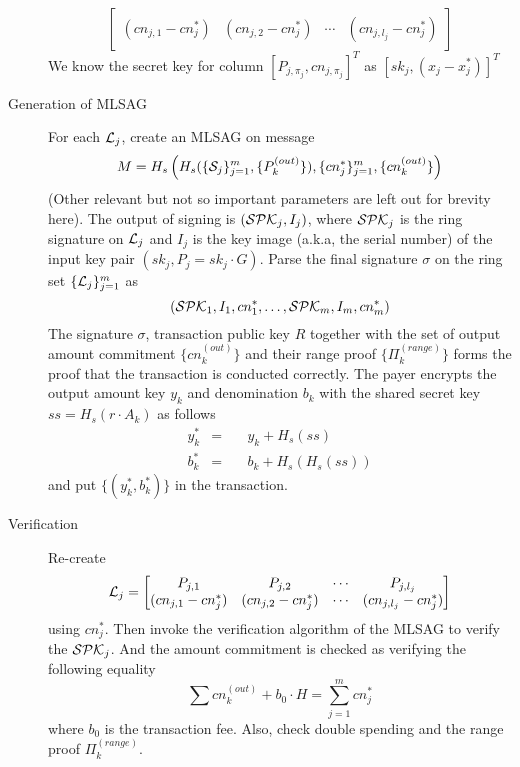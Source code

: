 \begin{description}
\[\begin{bmatrix}
				(cn_{j,1}-cn_j^*) &(cn_{j,2}-cn_j^*) &\cdots &(cn_{j,l_j}-cn_j^*)
			\end{bmatrix}
		\]
		We know the secret key for column \([P_{j,\pi_j}, cn_{j,\pi_j}]^T\) as \([sk_j,(x_j-x_j^*)]^T\)
		\item[Generation of MLSAG] For each \(\mathcal{L}_j\), create an MLSAG on message 
		\[
			M=H_s\left(H_s(\{\mathcal{S}_j\}_{j=1}^m, \{P_k^{(out)}\}),\{cn_j^*\}_{j=1}^m,\{cn_k^{(out)}\}\right)
		\] 
		(Other relevant but not so important parameters are left out for brevity here). The output of signing is \((\mathcal{SPK}_j, I_j)\), where \(\mathcal{SPK}_j\) is the ring signature on \(\mathcal{L}_j\) and \(I_j\) is the key image (a.k.a, the serial number) of the input key pair \( (sk_j,P_j=sk_j\cdot G)\). Parse the final signature \(\sigma\) on the ring set \(\{\mathcal{L}_j\}_{j=1}^m\) as 
		\[
			(\mathcal{SPK}_1,I_1,cn_1^*,\dots,\mathcal{SPK}_m,I_m,cn_m^*)
		\]
		The signature \(\sigma\), transaction public key \(R\) together with the set of output amount commitment \(\{cn_k^{(out)}\}\) and their range proof \(\{\Pi_k^{(range)}\}\) forms the proof that the transaction is conducted correctly. The payer encrypts the output amount key \(y_k\) and denomination \(b_k\) with the shared secret key \(ss=H_s(r\cdot A_k)\) as follows
		\[
			\begin{aligned}
				y_k^* &= &\quad y_k+H_s(ss) \\
				b_k^* &= &\quad b_k+H_s(H_s(ss))
			\end{aligned}
		\]
		and put \(\{(y_k^*,b_k^*)\}\) in the transaction.
		\item[Verification] Re-create 
			\[
				\mathcal{L}_j=
				\begin{bmatrix}
					P_{j,1} &P_{j,2} &\cdots &P_{j,l_j} \\
					(cn_{j,1}-cn_j^*) &(cn_{j,2}-cn_j^*) &\cdots &(cn_{j,l_j}-cn_j^*)
				\end{bmatrix}
			\]
			using \(cn_j^*\). Then invoke the verification algorithm of the MLSAG to verify the \(\mathcal{SPK}_j\). And the amount commitment is checked as verifying the following equality 
			\[
				\sum cn_k^{(out)}+b_0\cdot H=\sum_{j=1}^m cn_j^*
			\]
			where \(b_0\) is the transaction fee. Also, check double spending and the range proof \(\Pi_k^{(range)}\).
	\end{description}
